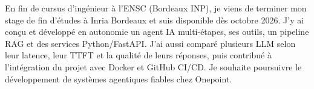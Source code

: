 
\begin{cvparagraph}
En fin de cursus d’ingénieur à l’ENSC (Bordeaux INP), je viens de terminer mon stage de fin d’études à Inria Bordeaux et suis disponible dès octobre 2026. J’y ai conçu et développé en autonomie un agent IA multi-étapes, ses outils, un pipeline RAG et des services Python/FastAPI. J’ai aussi comparé plusieurs LLM selon leur latence, leur TTFT et la qualité de leurs réponses, puis contribué à l’intégration du projet avec Docker et GitHub CI/CD. Je souhaite poursuivre le développement de systèmes agentiques fiables chez Onepoint.
\end{cvparagraph}
